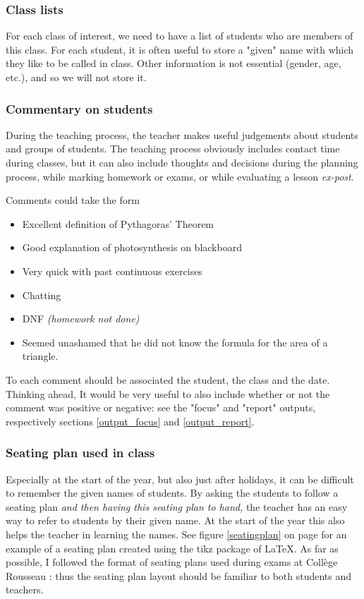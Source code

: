 \documentclass[10pt]{article}
\begin{document}
\subsubsection{Class lists}
For each class of interest, we need to have a list of students who are members of this class. For each student, it is often useful to store a "given" name with which they like to be called in class. Other information is not essential (gender, age, etc.), and so we will not store it.

\subsubsection{Commentary on students}
During the teaching process, the teacher makes useful judgements about students and groups of students. The teaching process obviously includes contact time during classes, but it can also include thoughts and decisions during the planning process, while marking homework or exams, or while evaluating a lesson \emph{ex-post}.

Comments could take the form
\begin{itemize}
\item Excellent definition of Pythagoras' Theorem
\item Good explanation of photosynthesis on blackboard
\item Very quick with past continuous exercises
\item Chatting
\item DNF \emph{(homework not done)}
\item Seemed unashamed that he did not know the formula for the area of a triangle.
\end{itemize}

To each comment should be associated the student, the class and the date. Thinking ahead, It would be very useful to also include whether or not the comment was positive or negative: see the "focus" and "report" outputs, respectively sections \ref{output_focus} and \ref{output_report}.

\subsubsection{Seating plan used in class}
Especially at the start of the year, but also just after holidays, it can be difficult to remember the given names of students. By asking the students to follow a seating plan \emph{and then having this seating plan to hand,} the teacher has an easy way to refer to students by their given name. At the start of the year this also helps the teacher in learning the names. See figure \ref{seatingplan} on page \pageref{seatingplan} for an example of a seating plan created using the tikz package of LaTeX. As far as possible, I followed the format of seating plans used during exams at Collège Rousseau : thus the seating plan layout should be familiar to both students and teachers.
\end{document}
